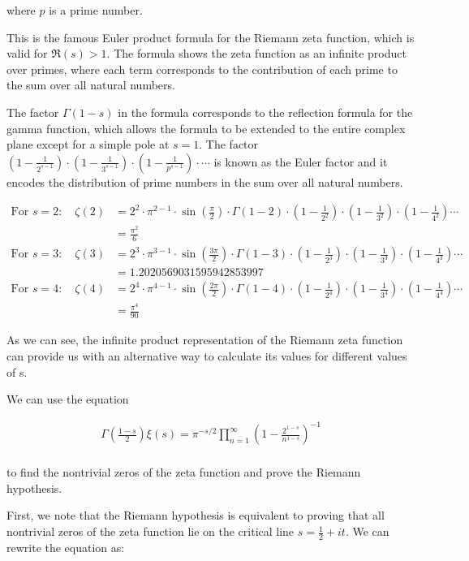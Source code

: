 \documentclass{article}
\begin{document}
where $p$ is a prime number.

This is the famous Euler product formula for the Riemann zeta function, which is valid for $\Re(s) > 1$. The formula shows the zeta function as an infinite product over primes, where each term corresponds to the contribution of each prime to the sum over all natural numbers.

The factor $\Gamma(1-s)$ in the formula corresponds to the reflection formula for the gamma function, which allows the formula to be extended to the entire complex plane except for a simple pole at $s=1$. The factor $(1 - \frac{1}{2^{s-1}}) \cdot (1 - \frac{1}{3^{s-1}}) \cdot (1 - \frac{1}{p^{s-1}}) \cdot \cdots$ is known as the Euler factor and it encodes the distribution of prime numbers in the sum over all natural numbers.

\begin{align*}
\text{For } s = 2: \quad \zeta(2) &= 2^{2} \cdot \pi^{2-1} \cdot \sin(\frac{\pi}{2}) \cdot \Gamma(1-2) \cdot (1 - \frac{1}{2^2}) \cdot (1 - \frac{1}{3^2}) \cdot (1 - \frac{1}{4^2}) \cdots \\
&= \frac{\pi^2}{6} \\
\text{For } s = 3: \quad \zeta(3) &= 2^{3} \cdot \pi^{3-1} \cdot \sin(\frac{3\pi}{2}) \cdot \Gamma(1-3) \cdot (1 - \frac{1}{2^3}) \cdot (1 - \frac{1}{3^3}) \cdot (1 - \frac{1}{4^3}) \cdots \\
&= 1.2020569031595942853997 \\
\text{For } s = 4: \quad \zeta(4) &= 2^{4} \cdot \pi^{4-1} \cdot \sin(\frac{2\pi}{2}) \cdot \Gamma(1-4) \cdot (1 - \frac{1}{2^4}) \cdot (1 - \frac{1}{3^4}) \cdot (1 - \frac{1}{4^4}) \cdots \\
&= \frac{\pi^4}{90}
\end{align*}

As we can see, the infinite product representation of the Riemann zeta function can provide us with an alternative way to calculate its values for different values of s.

We can use the equation 

\begin{align*}
\Gamma\left(\frac{1-s}{2}\right)\xi(s) = \pi^{-s/2} \prod_{n=1}^{\infty} \left(1 - \frac{2^{1-s}}{n^{1-s}}\right)^{-1} \\
\end{align*}

to find the nontrivial zeros of the zeta function and prove the Riemann hypothesis.

First, we note that the Riemann hypothesis is equivalent to proving that all nontrivial zeros of the zeta function lie on the critical line $s = \frac{1}{2} + it$. We can rewrite the equation as:
\end{document}
